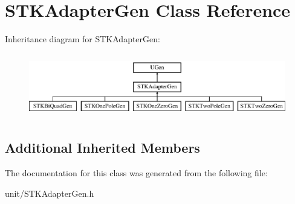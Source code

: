 \hypertarget{classSTKAdapterGen}{}\section{S\+T\+K\+Adapter\+Gen Class Reference}
\label{classSTKAdapterGen}
Inheritance diagram for S\+T\+K\+Adapter\+Gen\+:\begin{figure}[H]
\begin{center}
\leavevmode
\includegraphics[height=2.847458cm]{classSTKAdapterGen}
\end{center}
\end{figure}
\subsection*{Additional Inherited Members}


The documentation for this class was generated from the following file\+:\begin{DoxyCompactItemize}
\item 
unit/S\+T\+K\+Adapter\+Gen.\+h\end{DoxyCompactItemize}
